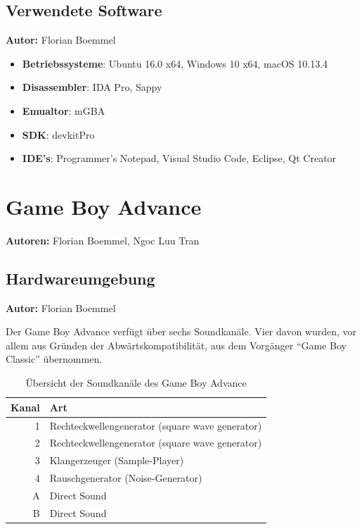 \documentclass[11pt,a4paper]{scrartcl}
\newcommand{\AutorFlorian} {
    \vspace{-4mm}
    \large \textbf{Autor:} Florian Boemmel \normalsize
    \vspace{2mm}
}
\newcommand{\AutorFlorianNgoc} {
    \vspace{-4mm}
    \large \textbf{Autoren:} Florian Boemmel, Ngoc Luu Tran \normalsize
    \vspace{2mm}
}
\begin{document}
\subsection{Verwendete Software}
\AutorFlorian

\begin{itemize}
    \item \textbf{Betriebssysteme}: Ubuntu 16.0 x64, Windows 10 x64, macOS 10.13.4
    \item \textbf{Disassembler}: IDA Pro, Sappy
    \item \textbf{Emualtor}: mGBA
    \item \textbf{SDK}: devkitPro
    \item \textbf{IDE's}: Programmer's Notepad, Visual Studio Code, Eclipse, Qt Creator
\end{itemize}

\newpage


\section{Game Boy Advance} \label{GameBoyAdvance}
\AutorFlorianNgoc

\subsection{Hardwareumgebung}
\AutorFlorian

Der Game Boy Advance verf\"ugt \"uber sechs Soundkan\"ale. Vier davon wurden, vor allem aus Gr\"unden der Abw\"artskompatibilit\"at, aus dem Vorg\"anger \enquote{Game Boy Classic} \"ubernommen.

\begin{table}[h]
    \centering
    \begin{tabular}{ r | p{10cm} }
        \textbf{Kanal} & \textbf{Art} \\
        \hline
        1 & Rechteckwellengenerator (square wave generator) \\
        \hline
        2 & Rechteckwellengenerator (square wave generator) \\
        \hline
        3 & Klangerzeuger (Sample-Player) \\
        \hline
        4 & Rauschgenerator (Noise-Generator) \\
        \hline
        A & Direct Sound \\
        \hline
        B & Direct Sound \\
    \end{tabular}
    \caption{\"Ubersicht der Soundkan\"ale des Game Boy Advance}
    \label{table:TechnischeDaten}
\end{table}
\end{document}
